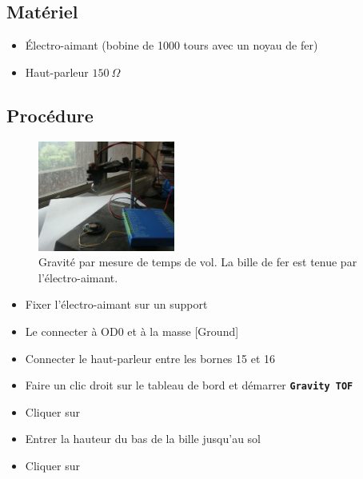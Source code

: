 \documentclass{book}
\newcommand{\nop}{}
\begin{document}
\subsection{Matériel}


\begin{itemize}
  \item Électro-aimant (bobine de 1000 tours avec un noyau de fer)
  \item Haut-parleur $150\ \Omega$
\end{itemize}

\subsection{Procédure}


\begin{figure}[h!]
\begin{center}
\caption{\label{fig:Gravity-by-TOF}Gravité par mesure de temps de vol. La bille de fer est tenue par l'électro-aimant. }\vspace{0.5em}
\includegraphics[width=0.4\textwidth, height=0.3\textwidth, keepaspectratio]{Pic-gravity-tof-photo.png}
\end{center}
\end{figure}



\begin{itemize}
  \item Fixer l'électro-aimant sur un support
  \item Le connecter à OD0 et à la masse [Ground]
  \item Connecter le haut-parleur entre les bornes 15 et 16
  \item Faire un clic droit sur le tableau de bord et démarrer  \texttt{\textbf{Gravity TOF}\nop}
  \item Cliquer sur  
  \item Entrer la hauteur du bas de la bille jusqu'au sol
  \item Cliquer sur  
\end{itemize}
\end{document}
